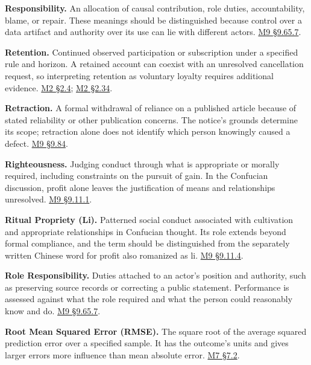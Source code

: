 \noindent\textbf{Responsibility.} An allocation of causal contribution, role
duties, accountability, blame, or repair. These meanings should be
distinguished because control over a data artifact and authority over
its use can lie with different actors.
\hyperref[M09-responsibility-for-the-artifact-and-its-uses]{M9
§9.65.7}.

\noindent\textbf{Retention.} Continued observed participation or subscription
under a specified rule and horizon. A retained account can coexist with
an unresolved cancellation request, so interpreting retention as
voluntary loyalty requires additional evidence.
\href{Marketing_Analytics_Lecture_Notes.pdf\#M02-cohorts-retention-and-customer-age}{M2
§2.4};
\href{Marketing_Analytics_Lecture_Notes.pdf\#M02-worked-example-retention-and-pending-cancellation}{M2
§2.34}.

\noindent\textbf{Retraction.} A formal withdrawal of reliance on a published
article because of stated reliability or other publication concerns. The
notice's grounds determine its scope; retraction alone does not identify
which person knowingly caused a defect.
\hyperref[M09-misleading-research-replication-and-correction]{M9
§9.84}.

\noindent\textbf{Righteousness.} Judging conduct through what is appropriate or
morally required, including constraints on the pursuit of gain. In the
Confucian discussion, profit alone leaves the justification of means and
relationships unresolved.
\hyperref[M09-righteousness-and-profit]{M9
§9.11.1}.

\noindent\textbf{Ritual Propriety (Li).} Patterned social conduct associated with
cultivation and appropriate relationships in Confucian thought. Its role
extends beyond formal compliance, and the term should be distinguished
from the separately written Chinese word for profit also romanized as
li.
\hyperref[M09-moral-beginnings-and-cultivated-conduct]{M9
§9.11.4}.

\noindent\textbf{Role Responsibility.} Duties attached to an actor's position and
authority, such as preserving source records or correcting a public
statement. Performance is assessed against what the role required and
what the person could reasonably know and do.
\hyperref[M09-responsibility-for-the-artifact-and-its-uses]{M9
§9.65.7}.

\noindent\textbf{Root Mean Squared Error (RMSE).} The square root of the average
squared prediction error over a specified sample. It has the outcome's
units and gives larger errors more influence than mean absolute error.
\href{Marketing_Analytics_Lecture_Notes.pdf\#M07-baselines-loss-functions-and-regularization}{M7
§7.2}.

